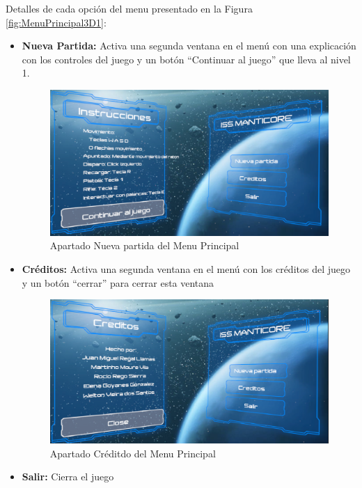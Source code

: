 Detalles de cada opción del menu presentado en la Figura \ref{fig:MenuPrincipal3D1}:
\begin{itemize}
	\item \textbf{Nueva Partida:} Activa una segunda ventana en el menú con una explicación con los controles del juego y un botón ``Continuar al juego'' que lleva al nivel 1.
	\begin{figure}[H]
		\centering
		\includegraphics[scale=0.35]{imagenes/MenuPrincipalNuevaPartida.png}
		\caption{\label{fig:MenuPrincipalNuevaPartida}Apartado Nueva partida del Menu Principal}
	\end{figure}
	\item \textbf{Créditos:} Activa una segunda ventana en el menú con los créditos del juego y un botón ``cerrar'' para cerrar esta ventana
	\begin{figure}[H]
		\centering
		\includegraphics[scale=0.35]{imagenes/MenuPrincipalCreditos.png}
		\caption{\label{fig:MenuPrincipalCreditos}Apartado Créditdo del Menu Principal}
	\end{figure}
	\item \textbf{Salir:} Cierra el juego 
\end{itemize}



